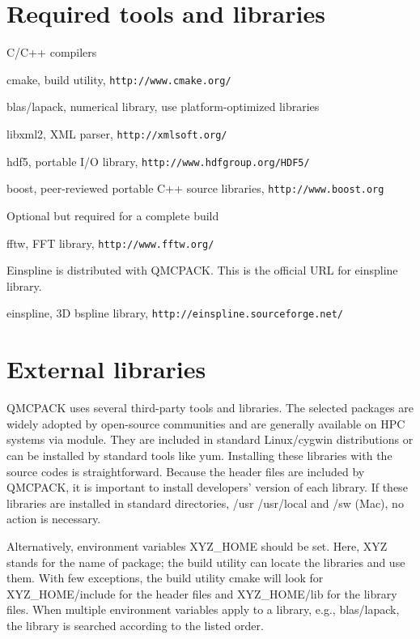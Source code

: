 \section{Required tools and libraries}\label{a00001_pre_sec}

\begin{DoxyItemize}
\item C/\-C++ compilers
\item cmake, build utility, {\tt http\-://www.\-cmake.\-org/}
\item blas/lapack, numerical library, use platform-\/optimized libraries
\item libxml2, X\-M\-L parser, {\tt http\-://xmlsoft.\-org/}
\item hdf5, portable I/\-O library, {\tt http\-://www.\-hdfgroup.\-org/\-H\-D\-F5/}
\item boost, peer-\/reviewed portable C++ source libraries, {\tt http\-://www.\-boost.\-org}
\end{DoxyItemize}

Optional but required for a complete build
\begin{DoxyItemize}
\item fftw, F\-F\-T library, {\tt http\-://www.\-fftw.\-org/}
\end{DoxyItemize}

Einspline is distributed with Q\-M\-C\-P\-A\-C\-K. This is the official U\-R\-L for einspline library.
\begin{DoxyItemize}
\item einspline, 3\-D bspline library, {\tt http\-://einspline.\-sourceforge.\-net/}
\end{DoxyItemize}\section{External libraries}\label{a00001_extlib_sec}
Q\-M\-C\-P\-A\-C\-K uses several third-\/party tools and libraries. The selected packages are widely adopted by open-\/source communities and are generally available on H\-P\-C systems via module. They are included in standard Linux/cygwin distributions or can be installed by standard tools like yum. Installing these libraries with the source codes is straightforward. Because the header files are included by Q\-M\-C\-P\-A\-C\-K, it is important to install developers’ version of each library. If these libraries are installed in standard directories, /usr /usr/local and /sw (Mac), no action is necessary.

Alternatively, environment variables X\-Y\-Z\-\_\-\-H\-O\-M\-E should be set. Here, X\-Y\-Z stands for the name of package; the build utility can locate the libraries and use them. With few exceptions, the build utility cmake will look for {\ttfamily X\-Y\-Z\-\_\-\-H\-O\-M\-E/include} for the header files and {\ttfamily X\-Y\-Z\-\_\-\-H\-O\-M\-E/lib} for the library files. When multiple environment variables apply to a library, e.\-g., blas/lapack, the library is searched according to the listed order.

